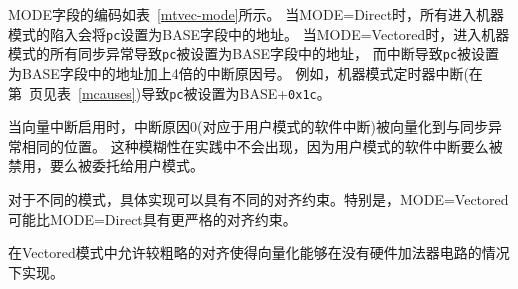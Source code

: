 \iffalse
The encoding of the MODE field is shown in Table~\ref{mtvec-mode}.  When
MODE=Direct, all traps into machine mode cause the {\tt pc} to be set to the
address in the BASE field.  When MODE=Vectored, all synchronous exceptions
into machine mode cause the {\tt pc} to be set to the address in the BASE
field, whereas interrupts cause the {\tt pc} to be set to the address in
the BASE field plus four times the interrupt cause number.  For example,
a machine-mode timer interrupt (see Table~\ref{mcauses} on page~\pageref{mcauses}) causes the {\tt pc}
to be set to BASE+{\tt 0x1c}.
\fi

MODE字段的编码如表~\ref{mtvec-mode}所示。
当MODE=Direct时，所有进入机器模式的陷入会将{\tt pc}设置为BASE字段中的地址。
当MODE=Vectored时，进入机器模式的所有同步异常导致{\tt pc}被设置为BASE字段中的地址，
而中断导致{\tt pc}被设置为BASE字段中的地址加上4倍的中断原因号。
例如，机器模式定时器中断(在第~\pageref{mcauses}页见表~\ref{mcauses})导致{\tt pc}被设置为BASE+{\tt 0x1c}。

\iffalse
\begin{commentary}
When vectored interrupts are enabled, interrupt cause 0, which corresponds to
user-mode software interrupts, are vectored to the same location as
synchronous exceptions.  This ambiguity does not arise in practice, since
user-mode software interrupts are either disabled or delegated to user mode.
\end{commentary}
\fi

\begin{commentary}
当向量中断启用时，中断原因0(对应于用户模式的软件中断)被向量化到与同步异常相同的位置。
这种模糊性在实践中不会出现，因为用户模式的软件中断要么被禁用，要么被委托给用户模式。
\end{commentary}

\iffalse
An implementation may have different alignment constraints for
different modes.  In particular, MODE=Vectored may have stricter
alignment constraints than MODE=Direct.
\fi

对于不同的模式，具体实现可以具有不同的对齐约束。特别是，MODE=Vectored可能比MODE=Direct具有更严格的对齐约束。

\iffalse
\begin{commentary}
  Allowing coarser alignments in Vectored mode enables vectoring to be
  implemented without a hardware adder circuit.
\end{commentary}
\fi

\begin{commentary}
  在Vectored模式中允许较粗略的对齐使得向量化能够在没有硬件加法器电路的情况下实现。
\end{commentary}

